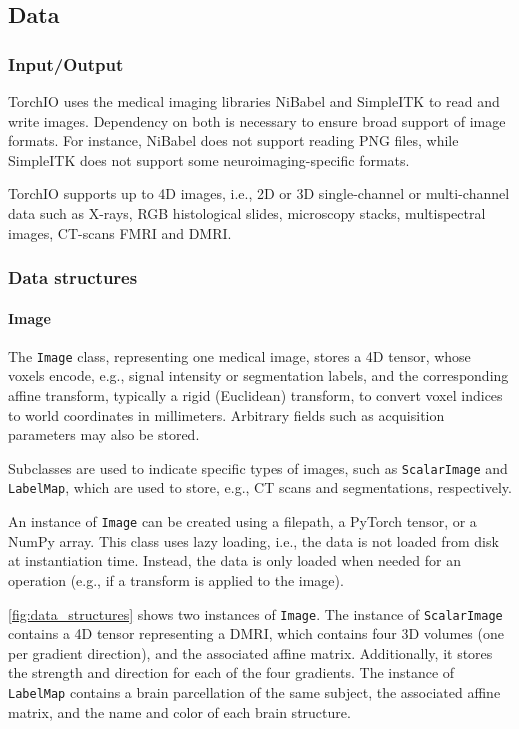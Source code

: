 \subsection{Data}

\subsubsection{Input/Output}

TorchIO uses the medical imaging libraries NiBabel and SimpleITK to read and
write images.
%
Dependency on both is necessary to ensure broad support of image formats.
%
For instance, NiBabel does not support reading \ac{PNG} files,
while SimpleITK does not support some neuroimaging-specific formats.


TorchIO supports up to 4D images, i.e., 2D or 3D single-channel or multi-channel
data such as X-rays, \ac{RGB} histological slides, microscopy stacks,
multispectral images, \ac{CT}-scans \ac{FMRI} and \ac{DMRI}.


\subsubsection{Data structures}
\label{sec:data_structures}

\paragraph{Image}

The \texttt{Image} class, representing one medical image,
stores a 4D tensor, whose voxels encode, e.g., signal intensity or segmentation
labels, and the corresponding affine transform,
typically a rigid (Euclidean) transform, to convert
voxel indices to world coordinates in millimeters.
%
Arbitrary fields such as acquisition parameters may also be stored.


Subclasses are used to indicate specific types of images,
such as \texttt{ScalarImage} and \texttt{LabelMap},
which are used to store, e.g., \ac{CT} scans and segmentations, respectively.


An instance of \texttt{Image} can be created using a filepath, a PyTorch tensor,
or a NumPy array.
%
This class uses lazy loading, i.e., the data is not loaded from disk at
instantiation time.
%
Instead, the data is only loaded when needed for an operation
(e.g., if a transform is applied to the image).


\cref{fig:data_structures} shows two instances of \texttt{Image}.
%
The instance of \texttt{ScalarImage} contains a 4D tensor representing a
\ac{DMRI}, which contains four 3D volumes (one per gradient direction),
and the associated affine matrix.
%
Additionally, it stores the strength and direction for each of the four
gradients.
%
The instance of \texttt{LabelMap} contains a brain parcellation of the same
subject, the associated affine matrix, and the name and color of each brain
structure.


